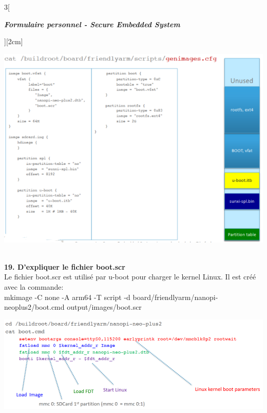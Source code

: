 \begin{multicols}{3}[\centerline{ \large\em \textbf{Formulaire personnel - Secure Embedded System}}][2cm]
\begin{minipage}{\linewidth}
	\centering
    \includegraphics[width =0.6\columnwidth]{images/52.png}
\end{minipage}
\\ \textbf{19. D’expliquer le fichier boot.scr\\}
Le fichier boot.scr est utilisé par u-boot pour charger le
kernel Linux. Il est créé avec la commande:\\
mkimage -C none -A arm64 -T script -d board/friendlyarm/nanopi-neoplus2/boot.cmd output/images/boot.scr\\
\begin{minipage}{\linewidth}
	\centering
    \includegraphics[width =0.8\columnwidth]{images/12.png}
\end{minipage}
\columnbreak


\end{multicols}
